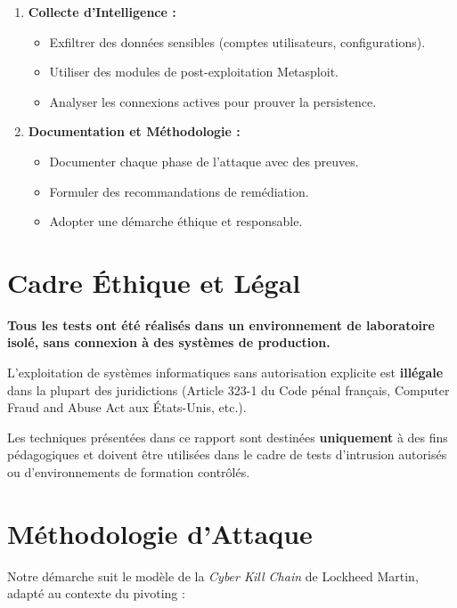 \documentclass[12pt,a4paper,openany]{report}
\begin{document}
\begin{enumerate}[leftmargin=*]
		\item \textbf{Collecte d'Intelligence :}
		\begin{itemize}
			\item Exfiltrer des données sensibles (comptes utilisateurs, configurations).
			\item Utiliser des modules de post-exploitation Metasploit.
			\item Analyser les connexions actives pour prouver la persistence.
		\end{itemize}
		
		\item \textbf{Documentation et Méthodologie :}
		\begin{itemize}
			\item Documenter chaque phase de l'attaque avec des preuves.
			\item Formuler des recommandations de remédiation.
			\item Adopter une démarche éthique et responsable.
		\end{itemize}
	\end{enumerate}
	
	\section{Cadre Éthique et Légal}
	
	\begin{tcolorbox}[colback=accent!5!white, colframe=accent, title=\textbf{AVERTISSEMENT LÉGAL}]
		\textbf{Tous les tests ont été réalisés dans un environnement de laboratoire isolé, sans connexion à des systèmes de production.}
		
		L'exploitation de systèmes informatiques sans autorisation explicite est \textbf{illégale} dans la plupart des juridictions (Article 323-1 du Code pénal français, Computer Fraud and Abuse Act aux États-Unis, etc.).
		
		Les techniques présentées dans ce rapport sont destinées \textbf{uniquement} à des fins pédagogiques et doivent être utilisées dans le cadre de tests d'intrusion autorisés ou d'environnements de formation contrôlés.
	\end{tcolorbox}
	
	\section{Méthodologie d'Attaque}
	
	Notre démarche suit le modèle de la \textit{Cyber Kill Chain} de Lockheed Martin, adapté au contexte du pivoting :
	
\end{document}
